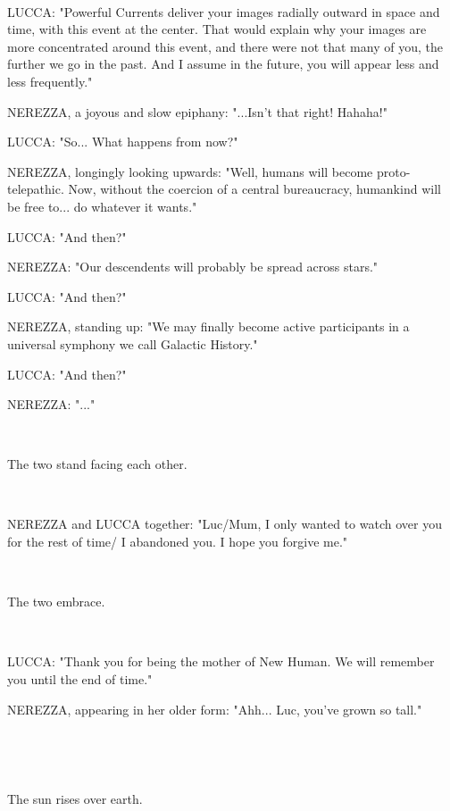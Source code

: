 \documentclass[11pt]{article}
\begin{document}
\ 

LUCCA: "Powerful Currents deliver your images radially outward in space and time, with this event at the center.
That would explain why your images are more concentrated around this event, and there were not that many of you, the further we go in the past.
And I assume in the future, you will appear less and less frequently."

NEREZZA, a joyous and slow epiphany: "...Isn't that right! Hahaha!"

LUCCA: "So... What happens from now?"

NEREZZA, longingly looking upwards: "Well, humans will become proto-telepathic. 
Now, without the coercion of a central bureaucracy, humankind will be free to... do whatever it wants."

LUCCA: "And then?"

NEREZZA: "Our descendents will probably be spread across stars."

LUCCA: "And then?"

NEREZZA, standing up: "We may finally become active participants in a universal symphony we call Galactic History."

LUCCA: "And then?"

NEREZZA: "..."

\ 

The two stand facing each other.

\ 

NEREZZA and LUCCA together: "Luc/Mum, I only wanted to watch over you for the rest of time/ I abandoned you.
I hope you forgive me."

\ 

The two embrace. 

\ 

LUCCA: "Thank you for being the mother of New Human.
We will remember you until the end of time."

NEREZZA, appearing in her older form: "Ahh... Luc, you've grown so tall."

\ 

\ 

The sun rises over earth.
\end{document}
